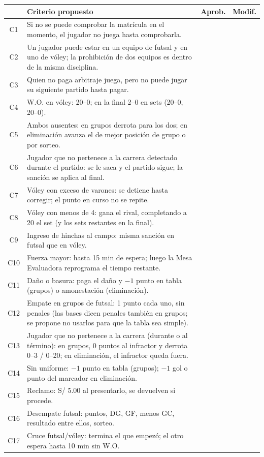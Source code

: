 \renewcommand{\arraystretch}{1.35}
{\small
\noindent\begin{tabularx}{\linewidth}{c >{\RaggedRight\arraybackslash}X c c}
	& \textbf{Criterio propuesto} & \textbf{Aprob.} & \textbf{Modif.}\\ \hline
	C1 & Si no se puede comprobar la matrícula en el momento, el jugador no juega hasta comprobarla. & \casilla & \casilla\\
	C2 & Un jugador puede estar en un equipo de futsal y en uno de vóley; la prohibición de dos equipos es dentro de la misma disciplina. & \casilla & \casilla\\
	C3 & Quien no paga arbitraje juega, pero no puede jugar su siguiente partido hasta pagar. & \casilla & \casilla\\
	C4 & W.O. en vóley: 20--0; en la final 2--0 en sets (20--0, 20--0). & \casilla & \casilla\\
	C5 & Ambos ausentes: en grupos derrota para los dos; en eliminación avanza el de mejor posición de grupo o por sorteo. & \casilla & \casilla\\
	C6 & Jugador que no pertenece a la carrera detectado durante el partido: se le saca y el partido sigue; la sanción se aplica al final. & \casilla & \casilla\\
	C7 & Vóley con exceso de varones: se detiene hasta corregir; el punto en curso no se repite. & \casilla & \casilla\\
	C8 & Vóley con menos de 4: gana el rival, completando a 20 el set (y los sets restantes en la final). & \casilla & \casilla\\
	C9 & Ingreso de hinchas al campo: misma sanción en futsal que en vóley. & \casilla & \casilla\\
	C10 & Fuerza mayor: hasta 15 min de espera; luego la Mesa Evaluadora reprograma el tiempo restante. & \casilla & \casilla\\
	C11 & Daño o basura: paga el daño y $-1$ punto en tabla (grupos) o amonestación (eliminación). & \casilla & \casilla\\
	C12 & Empate en grupos de futsal: 1 punto cada uno, sin penales (las bases dicen penales también en grupos; se propone no usarlos para que la tabla sea simple). & \casilla & \casilla\\
	C13 & Jugador que no pertenece a la carrera (durante o al término): en grupos, 0 puntos al infractor y derrota 0--3 / 0--20; en eliminación, el infractor queda fuera. & \casilla & \casilla\\
	C14 & Sin uniforme: $-1$ punto en tabla (grupos); $-1$ gol o punto del marcador en eliminación. & \casilla & \casilla\\
	C15 & Reclamo: S/ 5.00 al presentarlo, se devuelven si procede. & \casilla & \casilla\\
	C16 & Desempate futsal: puntos, DG, GF, menos GC, resultado entre ellos, sorteo. & \casilla & \casilla\\
	C17 & Cruce futsal/vóley: termina el que empezó; el otro espera hasta 10 min sin W.O. & \casilla & \casilla\\
\end{tabularx}
}

